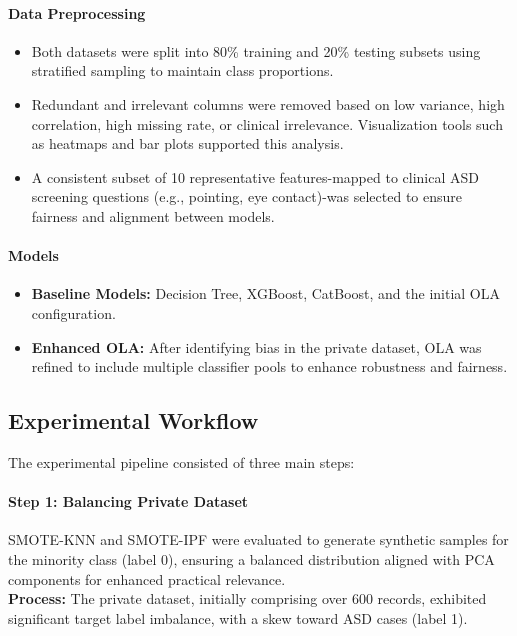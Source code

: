 \documentclass[conference]{IEEEtran}
\begin{document}
\paragraph{\textbf{Data Preprocessing}}
\begin{itemize}
\item Both datasets were split into 80\% training and 20\% testing subsets using stratified sampling to maintain class proportions.
\item Redundant and irrelevant columns were removed based on low variance, high correlation, high missing rate, or clinical irrelevance. Visualization tools such as heatmaps and bar plots supported this analysis.
\item A consistent subset of 10 representative features-mapped to clinical ASD screening questions (e.g., pointing, eye contact)-was selected to ensure fairness and alignment between models.
\end{itemize}

\paragraph{\textbf{Models}}
\begin{itemize}
\item \textbf{Baseline Models:} Decision Tree, XGBoost, CatBoost, and the initial OLA configuration.
\item \textbf{Enhanced OLA:} After identifying bias in the private dataset, OLA was refined to include multiple classifier pools to enhance robustness and fairness.\\

\end{itemize}

\subsection{Experimental Workflow}
The experimental pipeline consisted of three main steps:
\paragraph{\textbf{Step 1: Balancing Private Dataset}}

SMOTE-KNN and SMOTE-IPF were evaluated to generate synthetic samples for the minority class (label 0), ensuring a balanced distribution aligned with PCA components for enhanced practical relevance.\\
\textbf{Process:} The private dataset, initially comprising over 600 records, exhibited significant target label imbalance, with a skew toward ASD cases (label 1). 
\end{document}
